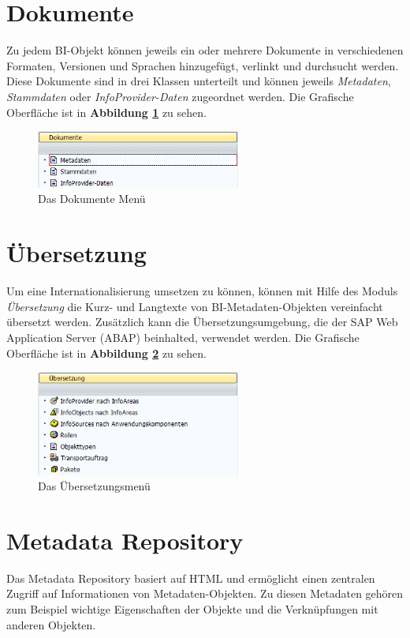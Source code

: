\pagebreak

\section{Dokumente} 
Zu jedem BI-Objekt können jeweils ein oder mehrere Dokumente in verschiedenen Formaten, Versionen und Sprachen hinzugefügt, verlinkt und durchsucht werden. Diese Dokumente sind in drei Klassen unterteilt und können jeweils \textit{Metadaten}, \textit{Stammdaten} oder \textit{InfoProvider-Daten} zugeordnet werden.
Die Grafische Oberfläche ist in  \textbf{Abbildung \ref{pic:Dokumente}}  zu sehen.
\begin{figure}[H]
    \centering
    \includegraphics[width=0.6\textwidth]{files/Dokumente}
    \caption{Das Dokumente Menü}
    \label{pic:Dokumente}
\end{figure}

\section{Übersetzung} 
Um eine Internationalisierung umsetzen zu können, können mit Hilfe des Moduls \textit{Übersetzung} die Kurz- und Langtexte von BI-Metadaten-Objekten vereinfacht übersetzt werden. Zusätzlich kann die Übersetzungsumgebung, die der SAP Web Application Server (ABAP) beinhalted, verwendet werden.
Die Grafische Oberfläche ist in \textbf{Abbildung \ref{pic:Uebersetzung}} zu sehen.
\begin{figure}[H]
    \centering
    \includegraphics[width=0.6\textwidth]{files/Uebersetzung}
    \caption{Das Übersetzungsmenü}
    \label{pic:Uebersetzung}
\end{figure}

\section{Metadata Repository}
 Das Metadata Repository basiert auf HTML und ermöglicht einen zentralen Zugriff auf Informationen von Metadaten-Objekten. Zu diesen Metadaten gehören zum Beispiel wichtige Eigenschaften der Objekte und die Verknüpfungen mit anderen Objekten.





